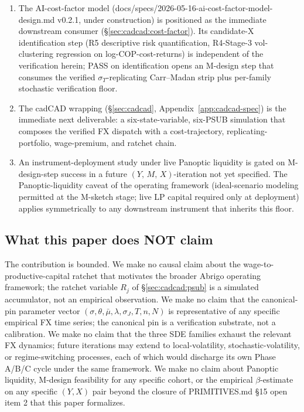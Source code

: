 \documentclass[11pt,letterpaper]{article}
\newcommand{\sigmaT}{\sigma_{T}}
\newcommand{\Ymx}{(Y,\,M,\,X)}
\begin{document}
\begin{enumerate}
    \item The AI-cost-factor model
        (\textsf{docs/specs/2026-05-16-ai-cost-factor-model-design.md}
        v0.2.1, under construction) is positioned as the immediate
        downstream consumer (\S\ref{sec:cadcad:cost-factor}). Its
        candidate-X identification step (R5 descriptive risk
        quantification, R4-Stage-3 vol-clustering regression on
        log-COP-cost-returns) is independent of the verification
        herein; PASS on identification opens an M-design step that
        consumes the verified $\sigmaT$-replicating Carr--Madan strip
        plus per-family stochastic verification floor.
    \item The cadCAD wrapping (\S\ref{sec:cadcad},
        Appendix~\ref{app:cadcad-spec}) is the immediate next
        deliverable: a six-state-variable, six-PSUB simulation that
        composes the verified FX dispatch with a cost-trajectory,
        replicating-portfolio, wage-premium, and ratchet chain.
    \item An instrument-deployment study under live Panoptic
        liquidity is gated on M-design-step success in a future
        \(\Ymx\)-iteration not yet specified. The Panoptic-liquidity
        caveat of the operating framework (ideal-scenario modeling
        permitted at the M-sketch stage; live LP capital required
        only at deployment) applies symmetrically to any downstream
        instrument that inherits this floor.
\end{enumerate}

\subsection{What this paper does NOT claim}
\label{sec:discussion:disclaim}

The contribution is bounded. We make no causal claim about the
wage-to-productive-capital ratchet that motivates the broader
Abrigo operating framework; the ratchet variable $R_{j}$ of
\S\ref{sec:cadcad:psub} is a simulated accumulator, not an empirical
observation. We make no claim that the canonical-pin parameter vector
$(\sigma, \theta, \bar\mu, \lambda, \sigma_{J}, T, n, N)$ is
representative of any specific empirical FX time series; the
canonical pin is a verification substrate, not a calibration.
We make no claim that the three SDE families exhaust the relevant
FX dynamics; future iterations may extend to local-volatility,
stochastic-volatility, or regime-switching processes, each of which
would discharge its own Phase A/B/C cycle under the same framework.
We make no claim about Panoptic liquidity, M-design feasibility for
any specific cohort, or the empirical $\beta$-estimate on any specific
$(Y, X)$ pair beyond the closure of PRIMITIVES.md \S15 open item 2
that this paper formalizes.
\end{document}
